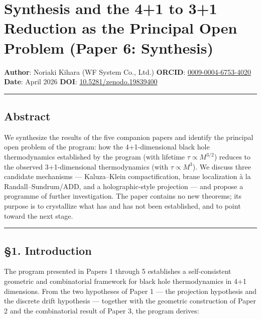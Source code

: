 \documentclass[a4paper,11pt]{article}
\theoremstyle{definition}
\begin{document}
\section{Synthesis and the 4+1 to 3+1 Reduction as the Principal Open
Problem (Paper 6:
Synthesis)}\label{synthesis-and-the-41-to-31-reduction-as-the-principal-open-problem-paper-6-synthesis}

\textbf{Author}: Noriaki Kihara (WF System Co., Ltd.) \textbf{ORCID}:
\href{https://orcid.org/0009-0004-6753-4020}{0009-0004-6753-4020}
\textbf{Date}: April 2026 \textbf{DOI}:
\href{https://doi.org/10.5281/zenodo.19839400}{10.5281/zenodo.19839400}

\begin{center}\rule{0.5\linewidth}{0.5pt}\end{center}

\subsection{Abstract}\label{abstract}

We synthesize the results of the five companion papers and identify the
principal open problem of the program: how the 4+1-dimensional black
hole thermodynamics established by the program (with lifetime
\(\tau \propto M^{3/2}\)) reduces to the observed 3+1-dimensional
thermodynamics (with \(\tau \propto M^3\)). We discuss three candidate
mechanisms --- Kaluza--Klein compactification, brane localization à la
Randall--Sundrum/ADD, and a holographic-style projection --- and propose
a programme of further investigation. The paper contains no new
theorems; its purpose is to crystallize what has and has not been
established, and to point toward the next stage.

\begin{center}\rule{0.5\linewidth}{0.5pt}\end{center}

\subsection{§1. Introduction}\label{introduction}

The program presented in Papers 1 through 5 establishes a
self-consistent geometric and combinatorial framework for black hole
thermodynamics in 4+1 dimensions. From the two hypotheses of Paper 1 ---
the projection hypothesis and the discrete drift hypothesis --- together
with the geometric construction of Paper 2 and the combinatorial result
of Paper 3, the program derives:
\end{document}
